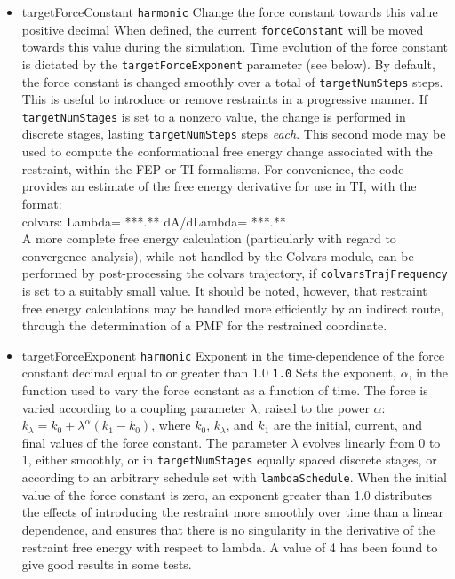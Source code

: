 \begin{itemize}

\item %
  \key
    {targetForceConstant}{%
    \texttt{harmonic}}{%
    Change the force constant towards this value}{%
    positive decimal}{%
    When defined, the current \texttt{forceConstant} will be moved towards
    this value during the simulation. Time evolution of the force constant
    is dictated by the \texttt{targetForceExponent} parameter (see below).
    By default, the force constant is changed smoothly over a total of
    \texttt{targetNumSteps} steps. This is useful to introduce or
    remove restraints in a progressive manner.
    If \texttt{targetNumStages} is set to a nonzero value, the
    change is performed in discrete stages, lasting \texttt{targetNumSteps}
    steps \emph{each}. This second mode may be used to compute the
    conformational free energy change associated with the restraint, within
    the FEP or TI formalisms. For convenience, the code provides an estimate
    of the free energy derivative for use in TI, with the format:\\
    {\ttfamily{}colvars:   Lambda= ***.** dA/dLambda= ***.**}\\
     A more complete free energy
    calculation (particularly with regard to convergence analysis),
    while not handled by the Colvars module, can be performed by post-processing
    the colvars trajectory, if \texttt{colvarsTrajFrequency} is set to a
    suitably small value. It should be noted, however, that restraint
    free energy calculations may be handled more efficiently by an
    indirect route, through the
    determination of a PMF for the restrained coordinate.\cite{Deng2009}}

\item %
  \keydef
    {targetForceExponent}{%
      \texttt{harmonic}}{%
      Exponent in the time-dependence of the force constant}{%
      decimal equal to or greater than 1.0}{%
    \texttt{1.0}}{%
    Sets the exponent, $\alpha$, in the function used to vary the force
    constant as a function of time. The force is varied according to a
    coupling parameter $\lambda$, raised to the power $\alpha$:
    $ k_\lambda = k_0 + \lambda^\alpha (k_1 - k_0)$, where $k_0$,
    $k_\lambda$, and $k_1$ are the initial, current, and final values
    of the force constant. The parameter $\lambda$ evolves linearly from
    0 to 1, either smoothly, or in \texttt{targetNumStages} equally spaced
    discrete stages, or according to an arbitrary schedule set with
    \texttt{lambdaSchedule}.
    When the initial value of the force constant is zero,
    an exponent greater than 1.0 distributes the effects of introducing the
    restraint more smoothly over time than a linear dependence, and
    ensures that there is no singularity in the derivative of the
    restraint free energy with respect to lambda. A value of 4 has
    been found to give good results in some tests.}


\end{itemize}
